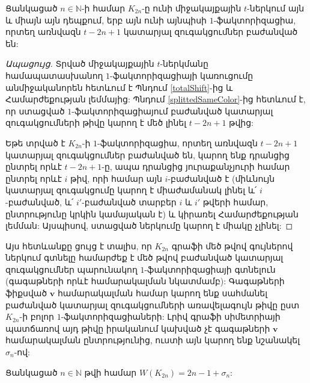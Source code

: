 \begin{corollary}\label{cEquiv}
Ցանկացած $n\in\mathbb{N}$-ի համար $K_{2n}$-ը ունի միջակայքային $t$-ներկում այն և միայն այն դեպքում, երբ այն ունի այնպիսի $1$-ֆակտորիզացիա, որտեղ առնվազն $t-2n+1$ կատարյալ զուգակցումներ բաժանված են:
\end{corollary}
\begin{proof}[Ապացույց]
Տրված միջակայքային $t$-ներկմանը համապատասխանող $1$-ֆակտորիզացիայի կառուցումը անմիջականորեն հետևում է Պնդում \ref{totalShift}-ից և Համարժեքության լեմմայից: Պնդում \ref{splittedSameColor}-ից հետևում է, որ ստացված $1$-ֆակտորիզացիայում բաժանված կատարյալ զուգակցումների թիվը կարող է մեծ լինել $t-2n+1$ թվից:

Եթե տրված է $K_{2n}$-ի $1$-ֆակտորիզացիա, որտեղ առնվազն $t-2n+1$ կատարյալ զուգակցումներ բաժանված են, կարող ենք դրանցից ընտրել որևէ $t-2n+1$-ը, ապա դրանցից յուրաքանչյուրի համար ընտրել որևէ $i$ թիվ, որի համար այն $i$-բաժանված է (միևնույն կատարյալ զուգակցումը կարող է միաժամանակ լինել և՛ $i$-բաժանված, և՛ $i'$-բաժանված տարբեր $i$ և $i'$ թվերի համար, ընտրությունը կրկին կամայական է) և կիրառել Համարժեքության լեմման: Այսպիսով, ստացված ներկումը կարող է միակը չլինել:
\end{proof}

Այս հետևանքը ցույց է տալիս, որ $K_{2n}$ գրաֆի մեծ թվով գույներով ներկում գտնելը համարժեք է մեծ թվով բաժանված կատարյալ զուգակցումներ պարունակող $1$-ֆակտորիզացիայի գտնելուն (գագաթների որևէ համարակալման նկատմամբ): Գագաթների ֆիքսված $\mathbf{v}$ համարակալման համար կարող ենք սահմանել բաժանված կատարյալ զուգակցումների առավելագույն թիվը ըստ $K_{2n}$-ի բոլոր $1$-ֆակտորիզացիաների: Լրիվ գրաֆի սիմետրիայի պատճառով այդ թիվը իրականում կախված չէ գագաթների $\mathbf{v}$ համարակալման ընտրությունից, ուստի այն կարող ենք նշանակել $\sigma_n$-ով:

\begin{theorem}\label{tEquiv}
Ցանկացած $n\in \mathbb{N}$ թվի համար $W(K_{2n}) = 2n-1+\sigma_n$:
\end{theorem}